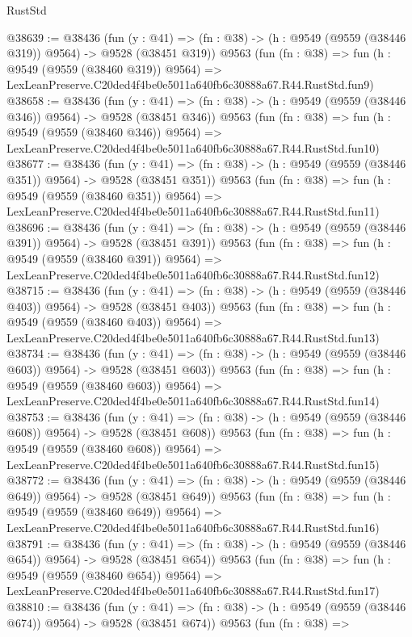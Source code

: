 \begin{lexlean}{RustStd}
\begin{coremodule}
@38639 := @38436
    (fun (y : @41) => (fn : @38) -> (h : @9549 (@9559 (@38446 @319)) @9564) -> @9528 (@38451 @319))
    @9563
    (fun (fn : @38) =>
    fun (h : @9549 (@9559 (@38460 @319)) @9564) =>
    LexLeanPreserve.C20ded4f4be0e5011a640fb6c30888a67.R44.RustStd.fun9)
@38658 := @38436
    (fun (y : @41) => (fn : @38) -> (h : @9549 (@9559 (@38446 @346)) @9564) -> @9528 (@38451 @346))
    @9563
    (fun (fn : @38) =>
    fun (h : @9549 (@9559 (@38460 @346)) @9564) =>
    LexLeanPreserve.C20ded4f4be0e5011a640fb6c30888a67.R44.RustStd.fun10)
@38677 := @38436
    (fun (y : @41) => (fn : @38) -> (h : @9549 (@9559 (@38446 @351)) @9564) -> @9528 (@38451 @351))
    @9563
    (fun (fn : @38) =>
    fun (h : @9549 (@9559 (@38460 @351)) @9564) =>
    LexLeanPreserve.C20ded4f4be0e5011a640fb6c30888a67.R44.RustStd.fun11)
@38696 := @38436
    (fun (y : @41) => (fn : @38) -> (h : @9549 (@9559 (@38446 @391)) @9564) -> @9528 (@38451 @391))
    @9563
    (fun (fn : @38) =>
    fun (h : @9549 (@9559 (@38460 @391)) @9564) =>
    LexLeanPreserve.C20ded4f4be0e5011a640fb6c30888a67.R44.RustStd.fun12)
@38715 := @38436
    (fun (y : @41) => (fn : @38) -> (h : @9549 (@9559 (@38446 @403)) @9564) -> @9528 (@38451 @403))
    @9563
    (fun (fn : @38) =>
    fun (h : @9549 (@9559 (@38460 @403)) @9564) =>
    LexLeanPreserve.C20ded4f4be0e5011a640fb6c30888a67.R44.RustStd.fun13)
@38734 := @38436
    (fun (y : @41) => (fn : @38) -> (h : @9549 (@9559 (@38446 @603)) @9564) -> @9528 (@38451 @603))
    @9563
    (fun (fn : @38) =>
    fun (h : @9549 (@9559 (@38460 @603)) @9564) =>
    LexLeanPreserve.C20ded4f4be0e5011a640fb6c30888a67.R44.RustStd.fun14)
@38753 := @38436
    (fun (y : @41) => (fn : @38) -> (h : @9549 (@9559 (@38446 @608)) @9564) -> @9528 (@38451 @608))
    @9563
    (fun (fn : @38) =>
    fun (h : @9549 (@9559 (@38460 @608)) @9564) =>
    LexLeanPreserve.C20ded4f4be0e5011a640fb6c30888a67.R44.RustStd.fun15)
@38772 := @38436
    (fun (y : @41) => (fn : @38) -> (h : @9549 (@9559 (@38446 @649)) @9564) -> @9528 (@38451 @649))
    @9563
    (fun (fn : @38) =>
    fun (h : @9549 (@9559 (@38460 @649)) @9564) =>
    LexLeanPreserve.C20ded4f4be0e5011a640fb6c30888a67.R44.RustStd.fun16)
@38791 := @38436
    (fun (y : @41) => (fn : @38) -> (h : @9549 (@9559 (@38446 @654)) @9564) -> @9528 (@38451 @654))
    @9563
    (fun (fn : @38) =>
    fun (h : @9549 (@9559 (@38460 @654)) @9564) =>
    LexLeanPreserve.C20ded4f4be0e5011a640fb6c30888a67.R44.RustStd.fun17)
@38810 := @38436
    (fun (y : @41) => (fn : @38) -> (h : @9549 (@9559 (@38446 @674)) @9564) -> @9528 (@38451 @674))
    @9563
    (fun (fn : @38) =>

\end{coremodule}
\end{lexlean}
